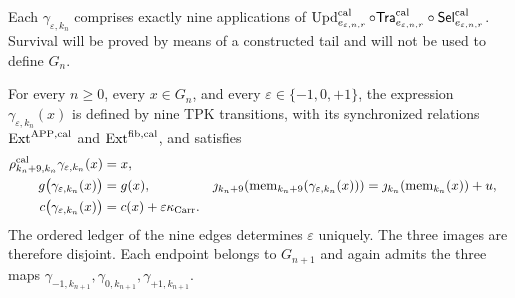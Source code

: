 Each \(\gamma_{\varepsilon,k_n}\) comprises exactly nine applications
of \(\operatorname{Upd}^{\rm cal}_{e_{\varepsilon,n,r}}\circ
\mathsf{Tra}^{\rm cal}_{e_{\varepsilon,n,r}}\circ
\mathsf{Sel}^{\rm cal}_{e_{\varepsilon,n,r}}\). Survival will be proved by
means of a constructed tail and will not be used to define \(G_n\).

\begin{lemma}
\label{hmtfg:lem:elevacion-catalogal-nonadica}
For every \(n\ge0\), every \(x\in G_n\), and every
\(\varepsilon\in\{-1,0,+1\}\), the expression
\(\gamma_{\varepsilon,k_n}(x)\) is defined by nine TPK transitions, with its
synchronized relations
\(\operatorname{Ext}^{\mathrm{APP},\rm cal}\) and
\(\operatorname{Ext}^{\rm fib,cal}\), and satisfies
\begin{align}
 \rho^{\rm cal}_{k_n+9,k_n}\gamma_{\varepsilon,k_n}(x)&=x,
 \label{hmtfg:eq:truncamiento-injerto-ch}\\
 g\bigl(\gamma_{\varepsilon,k_n}(x)\bigr)
   &=g(x),&
 \jmath_{k_n+9}\!\left(\operatorname{mem}_{k_n+9}
        (\gamma_{\varepsilon,k_n}(x))\right)
   &=\jmath_{k_n}\!\left(\operatorname{mem}_{k_n}(x)\right)+u,
 \label{hmtfg:eq:fase-memoria-injerto-ch}\\
 c\bigl(\gamma_{\varepsilon,k_n}(x)\bigr)
   &=c(x)+\varepsilon\kappa_{\rm Carr}.&&
 \label{hmtfg:eq:carry-injerto-ch}
\end{align}
\label{hmtfg:eq:tres-vueltas-propiedades-ch}
\label{hmtfg:eq:tres-vueltas-acarreo-ch}
The ordered ledger of the nine edges determines \(\varepsilon\) uniquely.
The three images are therefore disjoint. Each endpoint belongs to
\(G_{n+1}\) and again admits the three maps
\(\gamma_{-1,k_{n+1}},\gamma_{0,k_{n+1}},
\gamma_{+1,k_{n+1}}\).
\end{lemma}

